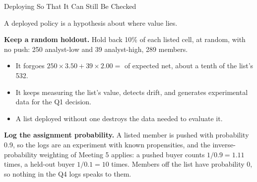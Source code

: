\documentclass[aspectratio=169, 11pt, handout]{beamer}
\begin{document}
\begin{frame}{Deploying So That It Can Still Be Checked}

A deployed policy is a hypothesis about where value lies.

\medskip

\textbf{Keep a random holdout.} Hold back 10\% of each listed cell, at random, with no push: 250 analyst-low and 39 analyst-high, 289 members.
\begin{itemize}
  \item It forgoes $250 \times 3.50 + 39 \times 2.00 = $  of expected net, about a tenth of the list's 532.
  \item It keeps measuring the list's value, detects drift, and generates experimental data for the Q1 decision.
  \item A list deployed without one destroys the data needed to evaluate it.
\end{itemize}

\medskip

\textbf{Log the assignment probability.} A listed member is pushed with probability 0.9, so the logs are an experiment with known propensities, and the inverse-probability weighting of Meeting 5 applies: a pushed buyer counts $1/0.9 = 1.11$ times, a held-out buyer $1/0.1 = 10$ times. Members off the list have probability 0, so nothing in the Q4 logs speaks to them.
\end{frame}
\end{document}
